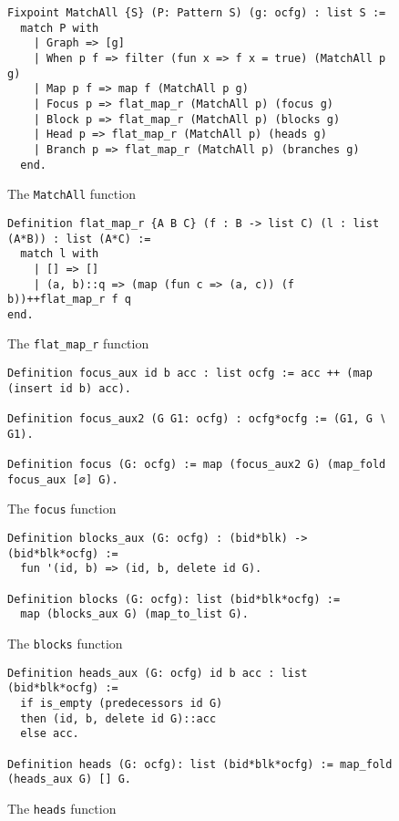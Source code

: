 \documentclass[11pt]{article}
\newcommand{\inlinecoq}[1]{\mbox{\lstinline[style=customcoq,columns=fixed,basewidth=.48em]{#1}}}
\newcommand{\ilc}[1]{\inlinecoq{#1}}
\begin{document}
\begin{figure}
  \label{fig:match}
  \begin{lstlisting}[style=customcoq,basicstyle=\small\ttfamily]
Fixpoint MatchAll {S} (P: Pattern S) (g: ocfg) : list S :=
  match P with
    | Graph => [g]
    | When p f => filter (fun x => f x = true) (MatchAll p g) 
    | Map p f => map f (MatchAll p g)
    | Focus p => flat_map_r (MatchAll p) (focus g)
    | Block p => flat_map_r (MatchAll p) (blocks g)
    | Head p => flat_map_r (MatchAll p) (heads g)
    | Branch p => flat_map_r (MatchAll p) (branches g)
  end.
  \end{lstlisting}
  \caption{The \ilc{MatchAll} function}
  \label{fig:matchall}
\end{figure}

\begin{figure}
  \label{fig:fmapr}
  \begin{lstlisting}[style=customcoq,basicstyle=\small\ttfamily]
Definition flat_map_r {A B C} (f : B -> list C) (l : list (A*B)) : list (A*C) :=
  match l with
    | [] => []
    | (a, b)::q => (map (fun c => (a, c)) (f b))++flat_map_r f q
end.
  \end{lstlisting}
  \caption{The \ilc{flat_map_r} function}
  \label{fig:flatmap}
\end{figure}
\begin{figure}
  \begin{lstlisting}[style=customcoq,basicstyle=\small\ttfamily]
Definition focus_aux id b acc : list ocfg := acc ++ (map (insert id b) acc).

Definition focus_aux2 (G G1: ocfg) : ocfg*ocfg := (G1, G ∖ G1).

Definition focus (G: ocfg) := map (focus_aux2 G) (map_fold focus_aux [∅] G).
  \end{lstlisting}
  \caption{The \ilc{focus} function}
  \label{fig:focus_fun}
\end{figure}
\begin{figure}
  \begin{lstlisting}[style=customcoq,basicstyle=\small\ttfamily]
Definition blocks_aux (G: ocfg) : (bid*blk) -> (bid*blk*ocfg) :=
  fun '(id, b) => (id, b, delete id G).

Definition blocks (G: ocfg): list (bid*blk*ocfg) :=
  map (blocks_aux G) (map_to_list G).
  \end{lstlisting}
  \caption{The \ilc{blocks} function}
  \label{fig:blocks_fun}
\end{figure}
\begin{figure}
  \begin{lstlisting}[style=customcoq,basicstyle=\small\ttfamily]
Definition heads_aux (G: ocfg) id b acc : list (bid*blk*ocfg) :=
  if is_empty (predecessors id G)
  then (id, b, delete id G)::acc
  else acc.

Definition heads (G: ocfg): list (bid*blk*ocfg) := map_fold (heads_aux G) [] G.
  \end{lstlisting}
  \caption{The \ilc{heads} function}
  \label{fig:heads_fun}
\end{figure}
\end{document}
